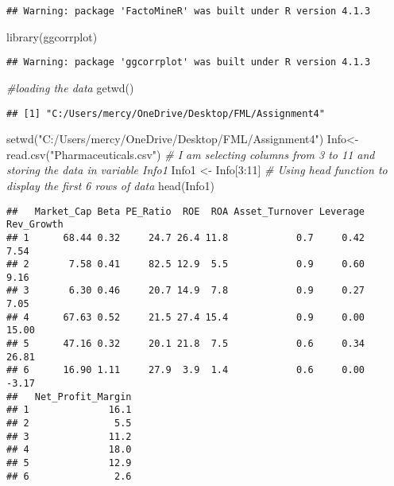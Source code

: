 \documentclass[
]{article}
\newenvironment{Shaded}{\begin{snugshade}}{\end{snugshade}}
\newcommand{\CommentTok}[1]{\textcolor[rgb]{0.56,0.35,0.01}{\textit{#1}}}
\newcommand{\DecValTok}[1]{\textcolor[rgb]{0.00,0.00,0.81}{#1}}
\newcommand{\FunctionTok}[1]{\textcolor[rgb]{0.00,0.00,0.00}{#1}}
\newcommand{\NormalTok}[1]{#1}
\newcommand{\OtherTok}[1]{\textcolor[rgb]{0.56,0.35,0.01}{#1}}
\newcommand{\SpecialCharTok}[1]{\textcolor[rgb]{0.00,0.00,0.00}{#1}}
\newcommand{\StringTok}[1]{\textcolor[rgb]{0.31,0.60,0.02}{#1}}
\begin{document}
\begin{verbatim}
## Warning: package 'FactoMineR' was built under R version 4.1.3
\end{verbatim}

\begin{Shaded}
\begin{Highlighting}[]
\FunctionTok{library}\NormalTok{(ggcorrplot)}
\end{Highlighting}
\end{Shaded}

\begin{verbatim}
## Warning: package 'ggcorrplot' was built under R version 4.1.3
\end{verbatim}

\begin{Shaded}
\begin{Highlighting}[]
\CommentTok{\#loading the data}
\FunctionTok{getwd}\NormalTok{()}
\end{Highlighting}
\end{Shaded}

\begin{verbatim}
## [1] "C:/Users/mercy/OneDrive/Desktop/FML/Assignment4"
\end{verbatim}

\begin{Shaded}
\begin{Highlighting}[]
\FunctionTok{setwd}\NormalTok{(}\StringTok{"C:/Users/mercy/OneDrive/Desktop/FML/Assignment4"}\NormalTok{)}
\NormalTok{Info}\OtherTok{\textless{}{-}} \FunctionTok{read.csv}\NormalTok{(}\StringTok{"Pharmaceuticals.csv"}\NormalTok{)}
\CommentTok{\# I am selecting columns from 3 to 11 and storing the data in variable Info1}
\NormalTok{Info1 }\OtherTok{\textless{}{-}}\NormalTok{ Info[}\DecValTok{3}\SpecialCharTok{:}\DecValTok{11}\NormalTok{]}
\CommentTok{\# Using head function to display the first 6 rows of data}
\FunctionTok{head}\NormalTok{(Info1)}
\end{Highlighting}
\end{Shaded}

\begin{verbatim}
##   Market_Cap Beta PE_Ratio  ROE  ROA Asset_Turnover Leverage Rev_Growth
## 1      68.44 0.32     24.7 26.4 11.8            0.7     0.42       7.54
## 2       7.58 0.41     82.5 12.9  5.5            0.9     0.60       9.16
## 3       6.30 0.46     20.7 14.9  7.8            0.9     0.27       7.05
## 4      67.63 0.52     21.5 27.4 15.4            0.9     0.00      15.00
## 5      47.16 0.32     20.1 21.8  7.5            0.6     0.34      26.81
## 6      16.90 1.11     27.9  3.9  1.4            0.6     0.00      -3.17
##   Net_Profit_Margin
## 1              16.1
## 2               5.5
## 3              11.2
## 4              18.0
## 5              12.9
## 6               2.6
\end{verbatim}
\end{document}
